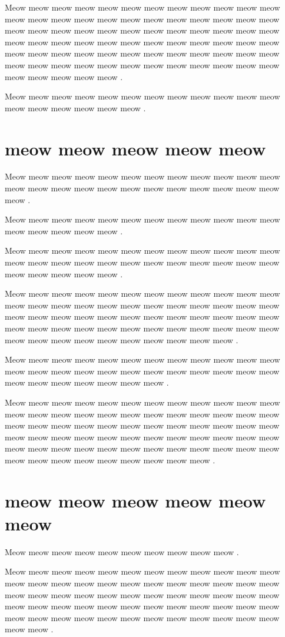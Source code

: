 \documentclass[12pt, a5paper, openany]{book}
\begin{document}
Meow meow meow meow meow meow meow meow meow meow meow meow meow meow meow meow meow meow meow meow meow meow meow meow meow meow meow meow meow meow meow meow meow meow meow meow meow meow meow meow meow meow meow meow meow meow meow meow meow meow meow meow meow meow meow meow meow meow meow meow meow meow meow meow meow meow meow meow meow meow meow meow meow meow meow meow meow .

Meow meow meow meow meow meow meow meow meow meow meow meow meow meow meow meow meow meow .



\chapter{meow meow meow meow meow }Meow meow meow meow meow meow meow meow meow meow meow meow meow meow meow meow meow meow meow meow meow meow meow meow meow .

Meow meow meow meow meow meow meow meow meow meow meow meow meow meow meow meow meow .

Meow meow meow meow meow meow meow meow meow meow meow meow meow meow meow meow meow meow meow meow meow meow meow meow meow meow meow meow meow .

Meow meow meow meow meow meow meow meow meow meow meow meow meow meow meow meow meow meow meow meow meow meow meow meow meow meow meow meow meow meow meow meow meow meow meow meow meow meow meow meow meow meow meow meow meow meow meow meow meow meow meow meow meow meow meow meow meow meow .

Meow meow meow meow meow meow meow meow meow meow meow meow meow meow meow meow meow meow meow meow meow meow meow meow meow meow meow meow meow meow meow .

Meow meow meow meow meow meow meow meow meow meow meow meow meow meow meow meow meow meow meow meow meow meow meow meow meow meow meow meow meow meow meow meow meow meow meow meow meow meow meow meow meow meow meow meow meow meow meow meow meow meow meow meow meow meow meow meow meow meow meow meow meow meow meow meow meow meow meow meow meow .



\chapter{meow meow meow meow meow meow }Meow meow meow meow meow meow meow meow meow meow .

Meow meow meow meow meow meow meow meow meow meow meow meow meow meow meow meow meow meow meow meow meow meow meow meow meow meow meow meow meow meow meow meow meow meow meow meow meow meow meow meow meow meow meow meow meow meow meow meow meow meow meow meow meow meow meow meow meow meow meow meow meow meow .
\end{document}
